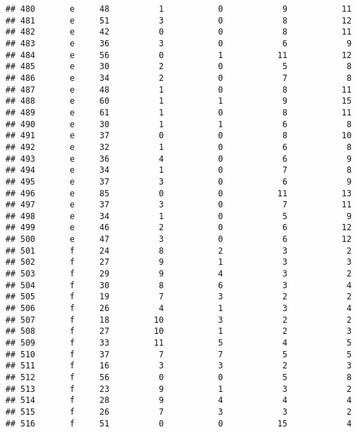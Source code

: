\documentclass[
]{article}
\begin{document}
\begin{verbatim}
## 480       e     48          1           0            9           11
## 481       e     51          3           0            8           12
## 482       e     42          0           0            8           11
## 483       e     36          3           0            6            9
## 484       e     56          0           1           11           12
## 485       e     30          2           0            5            8
## 486       e     34          2           0            7            8
## 487       e     48          1           0            8           11
## 488       e     60          1           1            9           15
## 489       e     61          1           0            8           11
## 490       e     30          1           1            6            8
## 491       e     37          0           0            8           10
## 492       e     32          1           0            6            8
## 493       e     36          4           0            6            9
## 494       e     34          1           0            7            8
## 495       e     37          3           0            6            9
## 496       e     85          0           0           11           13
## 497       e     37          3           0            7           11
## 498       e     34          1           0            5            9
## 499       e     46          2           0            6           12
## 500       e     47          3           0            6           12
## 501       f     24          8           2            3            2
## 502       f     27          9           1            3            3
## 503       f     29          9           4            3            2
## 504       f     30          8           6            3            4
## 505       f     19          7           3            2            2
## 506       f     26          4           1            3            4
## 507       f     18         10           3            2            2
## 508       f     27         10           1            2            3
## 509       f     33         11           5            4            5
## 510       f     37          7           7            5            5
## 511       f     16          3           3            2            3
## 512       f     56          0           0            5            8
## 513       f     23          9           1            3            2
## 514       f     28          9           4            4            4
## 515       f     26          7           3            3            2
## 516       f     51          0           0           15            4

\end{verbatim}
\end{document}
